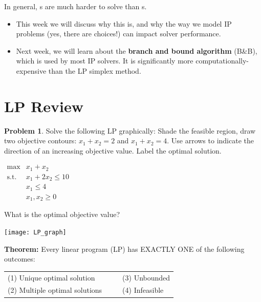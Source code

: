 \documentclass[11pt]{article}
\renewcommand{\labelitemi}{$\bullet$}
\theoremstyle{definition}
\newtheorem{problem}{Problem}
\newcommand{\answerbox}[3]{%
  \fbox{%
    \begin{minipage}[#1]{#2}
      \hfill\vspace{#3}
    \end{minipage}
  }
}
\newcommand{\catbox}{\answerbox{c}{.5in}{.7cm}}
\begin{document}
\begin{tcolorbox}
In general, \catbox s are much harder to solve than \catbox s.
\end{tcolorbox}

\renewcommand\labelitemi{$\bullet$}
\begin{itemize}
\item This week we will discuss why this is, and why the way we model IP problems (yes, there are choices!) can impact solver performance.
\item Next week, we will learn about the \textbf{branch and bound algorithm} (B\&B), which is used by most IP solvers.  It is significantly more computationally-expensive than the LP simplex method.
\end{itemize}

\section{LP Review}

\begin{problem}  
Solve the following LP graphically: Shade the feasible region, draw two objective contours:  $x_1 +x_2 =2$ and $x_1 + x_2 =4$.  Use arrows to indicate the direction of an increasing objective value.  Label the optimal solution.  

\begin{minipage}{0.6\textwidth}
$
\begin{array}{rl}
\text{max} & x_1+x_2 \\
\text{s.t.} & x_1+2x_2 \leq 10 \\
  & x_1  \leq  4 \\
  & x_1, x_2  \geq  0
\end{array}
$

\bigskip
What is the optimal objective value?
 \catbox
\end{minipage}
\begin{minipage}{0.4\textwidth}
\texttt{[image: LP\_graph]}
\end{minipage}



\end{problem}
\bigskip

\begin{tcolorbox}
\textbf{Theorem:} Every linear program (LP) has EXACTLY ONE of the following outcomes: 

\medskip
\begin{tabular}{ll}
(1) Unique optimal solution  ~~~~~& (3) Unbounded    \\
(2) Multiple optimal solutions & (4) Infeasible
\end{tabular}
\end{tcolorbox}
\end{document}
